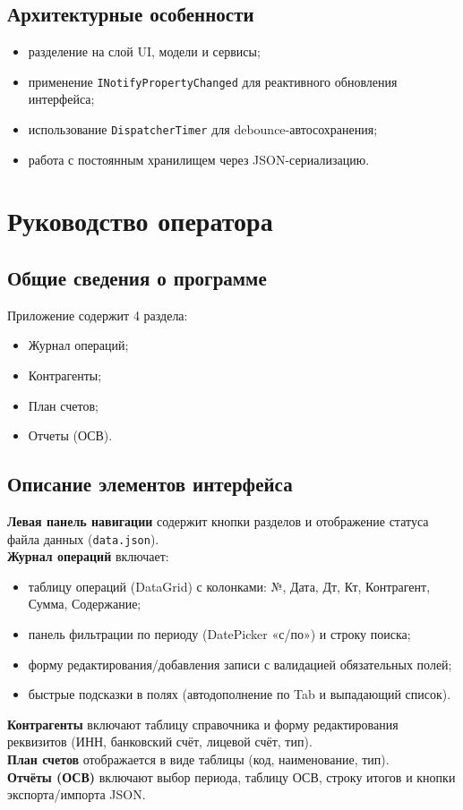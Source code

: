 \documentclass[14pt,a4paper]{extarticle}
\begin{document}
\subsection{Архитектурные особенности}
\begin{itemize}
    \item разделение на слой UI, модели и сервисы;
    \item применение \texttt{INotifyPropertyChanged} для реактивного обновления интерфейса;
    \item использование \texttt{DispatcherTimer} для debounce-автосохранения;
    \item работа с постоянным хранилищем через JSON-сериализацию.
\end{itemize}

\section{Руководство оператора}

\subsection{Общие сведения о программе}
Приложение содержит 4 раздела:
\begin{itemize}
    \item Журнал операций;
    \item Контрагенты;
    \item План счетов;
    \item Отчеты (ОСВ).
\end{itemize}

\subsection{Описание элементов интерфейса}
\textbf{Левая панель навигации} содержит кнопки разделов и отображение статуса файла данных (\texttt{data.json}).\\
\textbf{Журнал операций} включает:
\begin{itemize}
    \item таблицу операций (DataGrid) с колонками: №, Дата, Дт, Кт, Контрагент, Сумма, Содержание;
    \item панель фильтрации по периоду (DatePicker «с/по») и строку поиска;
    \item форму редактирования/добавления записи с валидацией обязательных полей;
    \item быстрые подсказки в полях (автодополнение по Tab и выпадающий список).
\end{itemize}
\textbf{Контрагенты} включают таблицу справочника и форму редактирования реквизитов (ИНН, банковский счёт, лицевой счёт, тип).\\
\textbf{План счетов} отображается в виде таблицы (код, наименование, тип).\\
\textbf{Отчёты (ОСВ)} включают выбор периода, таблицу ОСВ, строку итогов и кнопки экспорта/импорта JSON.
\end{document}
